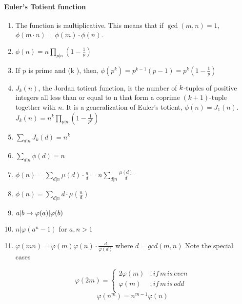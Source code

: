 \paragraph{Euler’s Totient function}\begin{enumerate}

            
            \item The function is multiplicative.
                This means that if $\displaystyle \gcd(m, n) = 1$, $\displaystyle \phi(m \cdot n) = \phi(m) \cdot
                \phi(n)$.
            
            \item $\displaystyle \phi(n) = n\prod_{p |n}(1 - \frac{1}{p} )$
            \item If p is prime and (k ), then,
                $\displaystyle \phi(p^k) = p^{k - 1}(p - 1) = p^k(1 - \frac{1}{p})$
            \item $J_k(n)$, the Jordan totient function, is the number of $\displaystyle \displaystyle k$-tuples of
                positive
                integers all less than or equal to n that form a coprime $\displaystyle (k + 1)$-tuple together with
                $n$. It
                is
                a generalization of Euler’s totient, $\displaystyle \phi(n) = J_1(n)$. 
                \(J_k(n) = n^k\prod_{p |n}(1 - \frac{1}{p^k})\)
            \item $\displaystyle \sum_{d|n}J_k(d) = n^k$
            \item $\displaystyle \sum_{d|n}\phi(d) = n$
            \item $\displaystyle \phi(n) = \sum_{d|n}\mu(d)\cdot\frac{n}{d} = n\sum_{d|n}\frac{\mu(d)}{d}$
            \item 
                $\displaystyle \phi(n) = \sum_{d|n}d\cdot\mu(\frac{n}{d})$

            
            \item $\displaystyle \displaystyle {a}\vert{b} \to \varphi(a)\vert{\varphi(b)}$
            \item $n\vert{\varphi(a^n - 1)}$ for $\displaystyle a, n > 1$
            \item 
                $\displaystyle \varphi(mn)=\varphi(m)\varphi(n)\cdot\frac{d}{\varphi(d)}$ where $d=gcd(m, n)$
                    Note the special cases

                \[\varphi(2m)=
                \begin{cases}
                2\varphi(m) & ; if \, m \, is \, even\\
                \varphi(m) & ; if \, m \, is \, odd\\
                \end{cases}\]
                \[\displaystyle \varphi(n^m)=n^{m-1}\varphi(n)\]
            

\end{enumerate}
